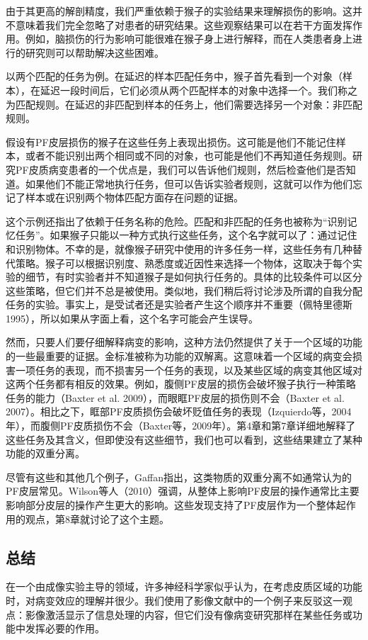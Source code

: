 \par
由于其更高的解剖精度，我们严重依赖于猴子的实验结果来理解损伤的影响。这并不意味着我们完全忽略了对患者的研究结果。这些观察结果可以在若干方面发挥作用。例如，脑损伤的行为影响可能很难在猴子身上进行解释，而在人类患者身上进行的研究则可以帮助解决这些困难。
\par
以两个匹配的任务为例。在延迟的样本匹配任务中，猴子首先看到一个对象（样本），在延迟一段时间后，它们必须从两个匹配样本的对象中选择一个。我们称之为匹配规则。在延迟的非匹配到样本的任务上，他们需要选择另一个对象：非匹配规则。
\par
假设有PF皮层损伤的猴子在这些任务上表现出损伤。这可能是他们不能记住样本，或者不能识别出两个相同或不同的对象，也可能是他们不再知道任务规则。研究PF皮质病变患者的一个优点是，我们可以告诉他们规则，然后检查他们是否知道。如果他们不能正常地执行任务，但可以告诉实验者规则，这就可以作为他们忘记了样本或在识别两个物体匹配方面存在问题的证据。
\par
这个示例还指出了依赖于任务名称的危险。匹配和非匹配的任务也被称为“识别记忆任务”。如果猴子只能以一种方式执行这些任务，这个名字就可以了：通过记住和识别物体。不幸的是，就像猴子研究中使用的许多任务一样，这些任务有几种替代策略。猴子可以根据识别度、熟悉度或近因性来选择一个物体，这取决于每个实验的细节，有时实验者并不知道猴子是如何执行任务的。具体的比较条件可以区分这些策略，但它们并不总是被使用。类似地，我们稍后将讨论涉及所谓的自我分配任务的实验。事实上，是受试者还是实验者产生这个顺序并不重要（佩特里德斯1995），所以如果从字面上看，这个名字可能会产生误导。
\par
然而，只要人们要仔细解释病变的影响，这种方法仍然提供了关于一个区域的功能的一些最重要的证据。金标准被称为功能的双解离。这意味着一个区域的病变会损害一项任务的表现，而不损害另一个任务的表现，以及某些区域的病变其他区域对这两个任务都有相反的效果。例如，腹侧PF皮层的损伤会破坏猴子执行一种策略任务的能力（Baxter et al. 2009），而眼眶PF皮层的损伤则不会（Baxter et al. 2007）。相比之下，眶部PF皮质损伤会破坏贬值任务的表现（Izquierdo等，2004年），而腹侧PF皮质损伤不会（Baxter等，2009年）。第4章和第7章详细地解释了这些任务及其含义，但即使没有这些细节，我们也可以看到，这些结果建立了某种功能的双重分离。
\par
尽管有这些和其他几个例子，Gaffan指出，这类物质的双重分离不如通常认为的PF皮层常见。Wilson等人（2010）强调，从整体上影响PF皮层的操作通常比主要影响部分皮层的操作产生更大的影响。这些发现支持了PF皮层作为一个整体起作用的观点，第8章就讨论了这个主题。
\subsection{总结}
在一个由成像实验主导的领域，许多神经科学家似乎认为，在考虑皮质区域的功能时，对病变效应的理解并很少。我们使用了影像文献中的一个例子来反驳这一观点：影像激活显示了信息处理的内容，但它们没有像病变研究那样在某些任务或功能中发挥必要的作用。
